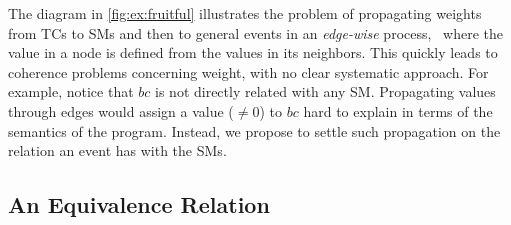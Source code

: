 \documentclass[x11names]{tlp}
\begin{document}
The diagram in \cref{fig:ex:fruitful} illustrates the problem of propagating weights from \aclp{TC} to \aclp{SM} and then to general events in an \emph{edge-wise} process, \ie\ where the value in a node is defined from the values in its neighbors.
This quickly leads to coherence problems concerning weight, with no clear systematic approach.
For example, notice that $bc$ is not directly related with any \acl{SM}.
Propagating values through edges would assign a value ($\not= 0$) to $bc$ hard to explain in terms of the semantics of the program.
Instead, we propose to settle such propagation on the relation an event has with the \aclp{SM}.

\subsection{An Equivalence Relation}
\label{subsec:equivalence.relation}
\end{document}
